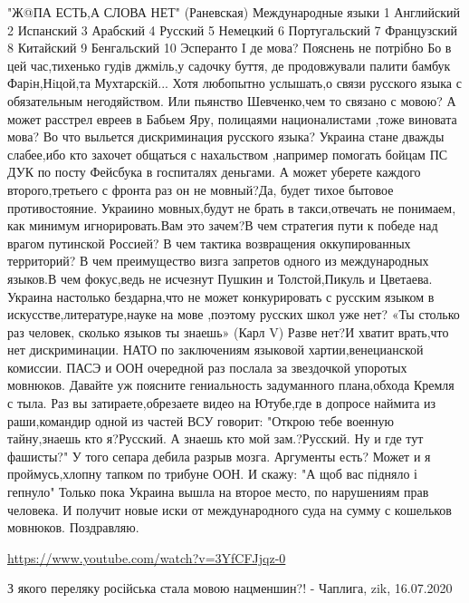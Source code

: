 \begin{itemize}
\obeycr
"Ж@ПА ЕСТЬ,А СЛОВА НЕТ" (Раневская)
Международные языки
1 Английский
2 Испанский
3 Арабский
4 Русский
5 Немецкий
6 Португальский
7 Французский
8 Китайский
9 Бенгальский
10 Эсперанто
I де мова? Пояснень не потрібно
Бо в цей час,тихенько гудів джміль,у садочку буття,
де продовжували палити бамбук
Фарiн,Нiцой,та Мухтарскiй...
Хотя любопытно услышать,о связи русского языка
с обязательным негодяйством.
Или пьянство Шевченко,чем то связано с мовою?
А может расстрел евреев в Бабьем Яру,
полицаями националистами
,тоже виновата мова?
Во что выльется дискриминация русского языка?
Украина стане дважды слабее,ибо кто захочет
общаться с нахальством ,например
помогать бойцам ПС ДУК по посту Фейсбука
в госпиталях деньгами.
А может уберете каждого второго,третьего с фронта
раз он не мовный?Да, будет тихое бытовое противостояние.
Украиино мовных,будут не брать в такси,отвечать не понимаем,
как минимум игнорировать.Вам это зачем?В чем стратегия
пути к победе над врагом путинской Россией?
В чем тактика возвращения оккупированных территорий?
В чем преимущество визга запретов одного из международных
языков.В чем фокус,ведь не исчезнут Пушкин и Толстой,Пикуль и Цветаева.
Украина настолько бездарна,что не может конкурировать с русским языком
в искусстве,литературе,науке на мове ,поэтому русских школ уже нет?
«Ты столько раз человек, сколько языков ты знаешь» (Карл V)
Разве нет?И хватит врать,что нет дискриминации.
НАТО по заключениям языковой хартии,венецианской комиссии. ПАСЭ и ООН
очередной раз послала за звездочкой упоротых мовнюков.
Давайте уж поясните гениальность задуманного плана,обхода Кремля с тыла.
Раз вы затираете,обрезаете видео на Ютубе,где в допросе
наймита из раши,командир одной из частей ВСУ говорит:
"Открою тебе военную тайну,знаешь кто я?Русский.
А знаешь кто мой зам.?Русский.
Ну и где тут фашисты?"
У того сепара дебила разрыв мозга.
Аргументы есть?
Может и я проймусь,хлопну тапком по трибуне ООН.
И скажу: "А щоб вас підняло і гепнуло"
Только пока Украина вышла на второе место,
по нарушениям прав человека.
И получит новые иски от международного суда
на сумму с кошельков мовнюков. Поздравляю.
\restorecr

\url{https://www.youtube.com/watch?v=3YfCFJjqz-0}\par
З якого переляку російська стала мовою нацменшин?! - Чаплига, zik, 16.07.2020

\begin{itemize}
 

\end{itemize}
\end{itemize}
